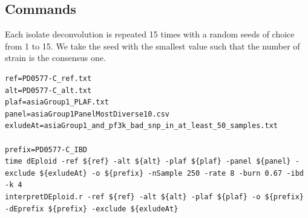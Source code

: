\documentclass[9pt]{article}
\begin{document}
\subsection{Commands}
Each isolate deconvolution is repeated 15 times with a random seeds of choice from 1 to 15. We take the seed with the smallest value such that the number of strain is the consensus one.
\linespread{1}
\begin{lstlisting}
ref=PD0577-C_ref.txt
alt=PD0577-C_alt.txt
plaf=asiaGroup1_PLAF.txt
panel=asiaGroup1PanelMostDiverse10.csv
exludeAt=asiaGroup1_and_pf3k_bad_snp_in_at_least_50_samples.txt

prefix=PD0577-C_IBD
time dEploid -ref ${ref} -alt ${alt} -plaf ${plaf} -panel ${panel} -exclude ${exludeAt} -o ${prefix} -nSample 250 -rate 8 -burn 0.67 -ibd -k 4
interpretDEploid.r -ref ${ref} -alt ${alt} -plaf ${plaf} -o ${prefix} -dEprefix ${prefix} -exclude ${exludeAt}
\end{lstlisting}









\end{document}

